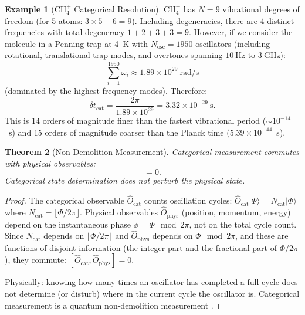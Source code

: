 \documentclass[11pt,a4paper]{article}
\newtheorem{theorem}{Theorem}[section]
\theoremstyle{definition}
\newtheorem{example}[theorem]{Example}
\theoremstyle{remark}
\newcommand{\Ocat}{\hat{O}_{\mathrm{cat}}}
\newcommand{\Ophys}{\hat{O}_{\mathrm{phys}}}
\begin{document}
\begin{example}[CH$_4^+$ Categorical Resolution]
\label{ex:ch4_temporal}
CH$_4^+$ has $N = 9$ vibrational degrees of freedom (for 5 atoms: $3 \times 5 - 6 = 9$). Including degeneracies, there are 4 distinct frequencies with total degeneracy $1 + 2 + 3 + 3 = 9$. However, if we consider the molecule in a Penning trap at 4~K with $N_{\mathrm{osc}} = 1950$ oscillators (including rotational, translational trap modes, and overtones spanning $10~\mathrm{Hz}$ to $3~\mathrm{GHz}$):
\begin{equation}
\sum_{i=1}^{1950} \omega_i \approx 1.89 \times 10^{29}~\mathrm{rad/s}
\end{equation}
(dominated by the highest-frequency modes). Therefore:
\begin{equation}
\delta t_{\mathrm{cat}} = \frac{2\pi}{1.89 \times 10^{29}} = 3.32 \times 10^{-29}~\mathrm{s}.
\end{equation}
This is 14 orders of magnitude finer than the fastest vibrational period ($\sim 10^{-14}$~s) and 15 orders of magnitude coarser than the Planck time ($5.39 \times 10^{-44}$~s).
\end{example}

\begin{theorem}[Non-Demolition Measurement]
\label{thm:nondemolition}
Categorical measurement commutes with physical observables:
\begin{equation}
[\Ocat, \Ophys] = 0.
\end{equation}
Categorical state determination does not perturb the physical state.
\end{theorem}

\begin{proof}
The categorical observable $\Ocat$ counts oscillation cycles: $\Ocat |\Phi\rangle = N_{\mathrm{cat}} |\Phi\rangle$ where $N_{\mathrm{cat}} = \lfloor \Phi/2\pi \rfloor$. Physical observables $\Ophys$ (position, momentum, energy) depend on the instantaneous phase $\phi = \Phi \mod 2\pi$, not on the total cycle count. Since $N_{\mathrm{cat}}$ depends on $\lfloor \Phi/2\pi \rfloor$ and $\Ophys$ depends on $\Phi \mod 2\pi$, and these are functions of disjoint information (the integer part and the fractional part of $\Phi/2\pi$), they commute: $[\Ocat, \Ophys] = 0$.

Physically: knowing how many times an oscillator has completed a full cycle does not determine (or disturb) where in the current cycle the oscillator is. Categorical measurement is a quantum non-demolition measurement \citep{landauer1961}.
\end{proof}
\end{document}
